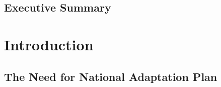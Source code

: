 \documentclass[
]{book}
\begin{document}
\hypertarget{executive-summary}{%
\section{Executive Summary}\label{executive-summary}}

\hypertarget{introduction}{%
\chapter{Introduction}\label{introduction}}

\hypertarget{the-need-for-national-adaptation-plan}{%
\section{The Need for National Adaptation Plan}\label{the-need-for-national-adaptation-plan}}
\end{document}
